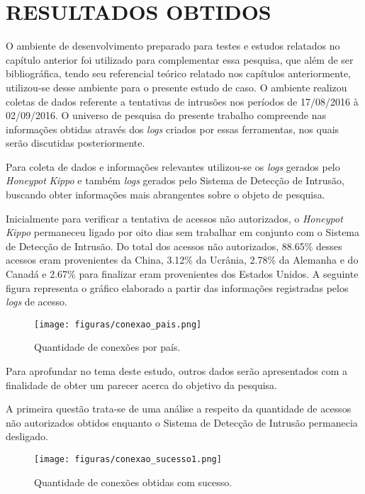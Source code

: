 \chapter{RESULTADOS OBTIDOS}
O ambiente de desenvolvimento preparado para testes e estudos relatados no capítulo anterior foi utilizado para complementar essa pesquisa, que além de ser bibliográfica, tendo seu referencial teórico relatado nos capítulos anteriormente, utilizou-se desse ambiente para o presente estudo de caso. O ambiente realizou coletas de dados referente a tentativas de intrusões nos períodos de 17/08/2016 à 02/09/2016. O universo de pesquisa do presente trabalho compreende nas informações obtidas através dos \textit{logs} criados por essas ferramentas, nos quais serão discutidas posteriormente.

Para coleta de dados e informações relevantes utilizou-se os \textit{logs} gerados pelo \textit{Honeypot} \textit{Kippo} e também \textit{logs} gerados pelo Sistema de Detecção de Intrusão, buscando obter informações mais abrangentes sobre o objeto de pesquisa.

Inicialmente para verificar a tentativa de acessos não autorizados, o \textit{Honeypot Kippo} permaneceu ligado por oito dias sem trabalhar em conjunto com o Sistema de Detecção de Intrusão. Do total dos acessos não autorizados, 88.65\% desses acessos eram provenientes da China, 3.12\% da Ucrânia, 2.78\% da Alemanha e do Canadá e 2.67\% para finalizar eram provenientes dos Estados Unidos. A seguinte figura representa o gráfico elaborado a partir das informações registradas pelos \textit{logs} de acesso.

\begin{figure}[!h]
\centering
\texttt{[image: figuras/conexao\_pais.png]}
\caption{Quantidade de conexões por país.} 	
\end{figure}

Para aprofundar no tema deste estudo, outros dados serão apresentados com a finalidade de obter um parecer acerca do objetivo da pesquisa.

A primeira questão trata-se de uma análise a respeito da quantidade de acessos não autorizados obtidos enquanto o Sistema de Detecção de Intrusão permanecia desligado.

\begin{figure}[!h]
\centering
\texttt{[image: figuras/conexao\_sucesso1.png]}
\caption{Quantidade de conexões obtidas com sucesso.} 	
\end{figure}

